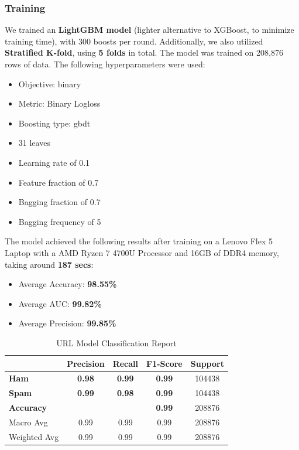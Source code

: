 \documentclass{article}
\begin{document}
\subsubsection*{Training}

\noindent
We trained an \textbf{LightGBM model} (lighter alternative to XGBoost, to minimize training time), with 300 boosts per round. Additionally, we also utilized \textbf{Stratified K-fold}, using \textbf{5 folds} in total. The model was trained on 208,876 rows of data. The following hyperparameters were used: 

\begin{itemize}
    \item Objective: binary
    \item Metric: Binary Logloss
    \item Boosting type: gbdt
    \item 31 leaves
    \item Learning rate of 0.1
    \item Feature fraction of 0.7
    \item Bagging fraction of 0.7
    \item Bagging frequency of 5
\end{itemize}

\noindent
The model achieved the following results after training on a Lenovo Flex 5 Laptop with a AMD Ryzen 7 4700U Processor and 16GB of DDR4 memory, taking around \textbf{187 secs}:

\begin{itemize}
    \item Average Accuracy: \textbf{98.55\%}
    \item Average AUC: \textbf{99.82\%}
    \item Average Precision: \textbf{99.85\%}
\end{itemize} 


\begin{table}[htbp]
    \centering
    \caption{URL Model Classification Report}
    \begin{tabular}{l c c c c}
    \toprule
     & \textbf{Precision} & \textbf{Recall} & \textbf{F1-Score} & Support \\
    \midrule
    \textbf{Ham} & \textbf{0.98} & \textbf{0.99} & \textbf{0.99} & 104438 \\
    \textbf{Spam} & \textbf{0.99} & \textbf{0.98} & \textbf{0.99} & 104438 \\
    \midrule
    \textbf{Accuracy} & & & \textbf{0.99} & 208876 \\
    Macro Avg & 0.99 & 0.99 & 0.99 & 208876 \\
    Weighted Avg & 0.99 & 0.99 & 0.99 & 208876 \\
    \bottomrule
    \end{tabular}
    \label{tab:classification_report}
\end{table}
\end{document}
